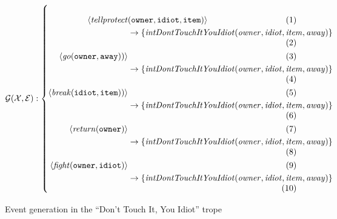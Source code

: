 \documentclass[11pt]{report}
\begin{document}
\begin{figure}[!th]
\abovedisplayskip=0pt
\abovedisplayshortskip=0pt
$\mathcal{G(X, E)}:\left\{\mbox{%
{\begin{minipage}[c]{0.85\textwidth}
\begin{align}
\langle \mathit{tellprotect}&\mathtt{(owner, idiot, item)} \rangle\nonumber\\
 &\rightarrow \left\{\mathit{intDontTouchItYouIdiot(owner, idiot, item, away)}\right\}\label{eq:gfirst-full}\\
                      \langle \mathit{go}\mathtt{(owner, away)}) \rangle \nonumber\\
 &\rightarrow \left\{\mathit{intDontTouchItYouIdiot(owner, idiot, item, away)}\right\}\\
                      \langle \mathit{break}\mathtt{(idiot, item)}) \rangle \nonumber\\
 &\rightarrow \left\{\mathit{intDontTouchItYouIdiot(owner, idiot, item, away)}\right\}\label{eq:receipt-full}\\
                      \langle \mathit{return}(\mathtt{owner}) \rangle \nonumber\\
 &\rightarrow \left\{\mathit{intDontTouchItYouIdiot(owner, idiot, item, away)}\right\}\label{eq:absentation-full}\\
                      \langle \mathit{fight}(\mathtt{owner, idiot}) \rangle \nonumber\\
 &\rightarrow \left\{\mathit{intDontTouchItYouIdiot(owner, idiot, item, away)}\right\}
\end{align}
\end{minipage}}}\right.$
\caption{Event generation in the ``Don't Touch It, You Idiot'' trope} \label{fig:gen-full}
\end{figure}
\end{document}
